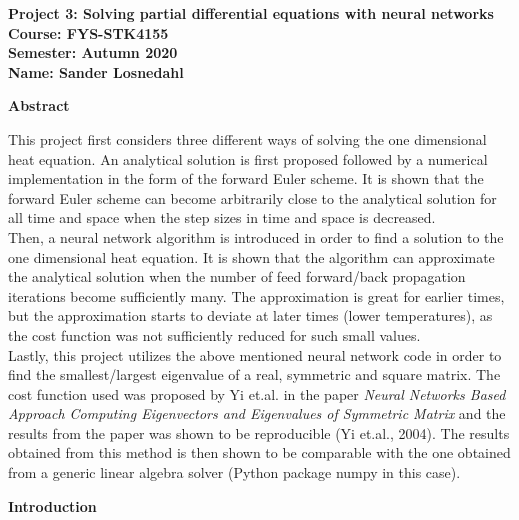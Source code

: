 \documentclass[12pt,a4paper]{article}
\begin{document}
\begin{center}
\LARGE{\textbf{Project 3: Solving partial differential equations with neural networks}}
\\
\large{\textbf{Course: FYS-STK4155}}
\\
\large{\textbf{Semester: Autumn 2020}}
\\
\large{\textbf{Name: Sander Losnedahl}}
\end{center}

\begin{center}
\Large{\textbf{Abstract}}
\end{center}

\noindent This project first considers three different ways of solving the one dimensional heat equation. An analytical solution is first proposed followed by a numerical implementation in the form of the forward Euler scheme. It is shown that the forward Euler scheme can become arbitrarily close to the analytical solution for all time and space when the step sizes in time and space is decreased. 
\\
Then, a neural network algorithm is introduced in order to find a solution to the one dimensional heat equation. It is shown that the algorithm can approximate the analytical solution when the number of feed forward/back propagation iterations become sufficiently many. The approximation is great for earlier times, but the approximation starts to deviate at later times (lower temperatures), as the cost function was not sufficiently reduced for such small values.
\\
Lastly, this project utilizes the above mentioned neural network code in order to find the smallest/largest eigenvalue of a real, symmetric and square matrix. The cost function used was proposed by Yi et.al. in the paper \emph{Neural Networks Based Approach Computing Eigenvectors and Eigenvalues of Symmetric Matrix} and the results from the paper was shown to be reproducible (Yi et.al., 2004). The results obtained from this method is then shown to be comparable with the one obtained from a generic linear algebra solver (Python package numpy in this case).

\newpage

\begin{center}
\Large{\textbf{Introduction}}
\end{center}
\end{document}

